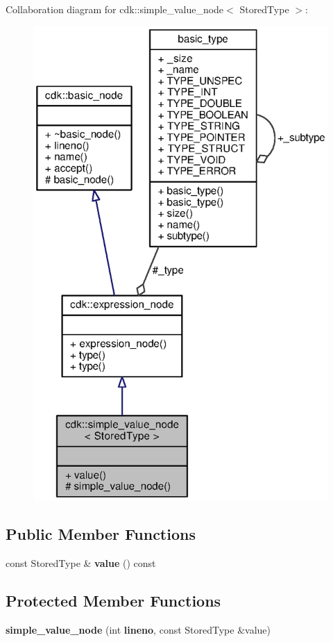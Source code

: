 Collaboration diagram for cdk\+:\+:simple\+\_\+value\+\_\+node$<$ Stored\+Type $>$\+:
\nopagebreak
\begin{figure}[H]
\begin{center}
\leavevmode
\includegraphics[width=325pt]{classcdk_1_1simple__value__node__coll__graph}
\end{center}
\end{figure}
\subsection*{Public Member Functions}
\begin{DoxyCompactItemize}
\item 
const Stored\+Type \& {\bfseries value} () const \label{classcdk_1_1simple__value__node_afc5c9ca681442aa1bd91f46e9e1e6580}

\end{DoxyCompactItemize}
\subsection*{Protected Member Functions}
\begin{DoxyCompactItemize}
\item 
{\bfseries simple\+\_\+value\+\_\+node} (int {\bf lineno}, const Stored\+Type \&value)\label{classcdk_1_1simple__value__node_a2b4713db4a16386e934c5842b0197c13}

\end{DoxyCompactItemize}
